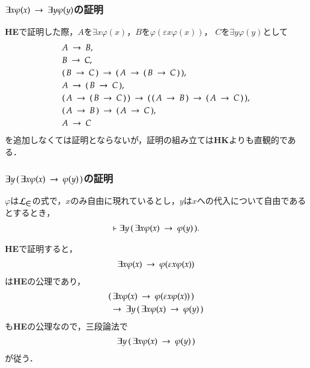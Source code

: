 \documentclass[dvipdfmx,10pt,notheorems]{beamer}
\theoremstyle{definition}
\newcommand{\lang}[1]{\mathcal{L}_{\scalebox{1.2}{$#1$}}} %
\newcommand{\rarrow}{\hspace{0.25em}\rightarrow\hspace{0.25em}} %
\begin{document}
\begin{frame}\frametitle{$\exists x \varphi(x) \rarrow \exists y \varphi(y)$の証明}
	{\bf HE}で証明した際，$A$を$\exists x \varphi(x)$，$B$を$\varphi(\varepsilon x \varphi(x))$， 
	$C$を$\exists y \varphi(y)$として
	\begin{align}
		&A \rarrow B, \\
		&B \rarrow C, \\
		&(\, B \rarrow C\, ) \rarrow (\, A \rarrow (\, B \rarrow C\, )\, ), \\
		&A \rarrow (\, B \rarrow C\, ), \\
		&(\, A \rarrow (\, B \rarrow C\, )\, ) \rarrow (\, (\, A \rarrow B\, ) \rarrow (\, A \rarrow C\, )\, ), \\
		&(\, A \rarrow B\, ) \rarrow (\, A \rarrow C\, ), \\
		&A \rarrow C
	\end{align}
	を追加しなくては証明とならないが，証明の組み立ては{\bf HK}よりも直観的である．
\end{frame}

\begin{frame}\frametitle{$\exists y\, (\, \exists x \varphi(x) \rarrow \varphi(y)\, )$の証明}
	\begin{block}{}
		$\varphi$は$\lang{\in}$の式で，$x$のみ自由に現れているとし，$y$は$x$への代入について自由であるとするとき，
		\begin{align}
			\vdash \exists y\, (\, \exists x \varphi(x) \rarrow \varphi(y)\, ).
		\end{align}
	\end{block}
	{\bf HE}で証明すると，
	\begin{align}
		\exists x \varphi(x) \rarrow \varphi(\varepsilon x \varphi(x))
	\end{align}
	は{\bf HE}の公理であり，
	\begin{align}
		&(\, \exists x \varphi(x) \rarrow \varphi(\varepsilon x \varphi(x))\, ) \\
		&\rarrow \exists y\, (\, \exists x \varphi(x) \rarrow \varphi(y)\, )
	\end{align}
	も{\bf HE}の公理なので，三段論法で
	\begin{align}
		\exists y\, (\, \exists x \varphi(x) \rarrow \varphi(y)\, )
	\end{align}
	が従う．
\end{frame}
\end{document}
